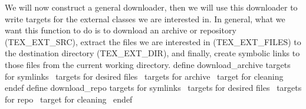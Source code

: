 We will now construct a general downloader, then we will use this downloader to
write targets for the external classes we are interested in.
In general, what we want this function to do is to download an archive or 
repository ({\Tt{}TEX{\_}EXT{\_}SRC\nwendquote}), extract the files we are interested in 
({\Tt{}TEX{\_}EXT{\_}FILES\nwendquote}) to the destination directory ({\Tt{}TEX{\_}EXT{\_}DIR\nwendquote}), and 
finally, create symbolic links to those files from the current working 
directory.
\nwenddocs{}\endmoddef\nwstartdeflinemarkup{}\nwenddeflinemarkup
define download_archive
\LA{}targets for symlinks~{\nwtagstyle{}}\RA{}
\LA{}targets for desired files~{\nwtagstyle{}}\RA{}
\LA{}targets for archive~{\nwtagstyle{}}\RA{}
\LA{}target for cleaning~{\nwtagstyle{}}\RA{}
endef
define download_repo
\LA{}targets for symlinks~{\nwtagstyle{}}\RA{}
\LA{}targets for desired files~{\nwtagstyle{}}\RA{}
\LA{}targets for repo~{\nwtagstyle{}}\RA{}
\LA{}target for cleaning~{\nwtagstyle{}}\RA{}
endef
\nwendcode{}\nwdocspar

